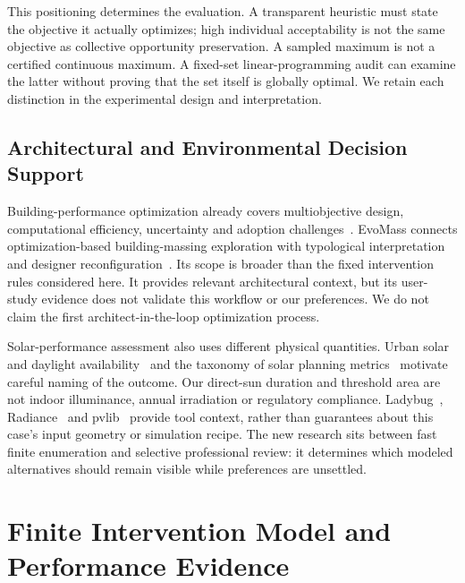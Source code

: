 \documentclass{llncs}
\begin{document}
This positioning determines the evaluation. A transparent heuristic must state the objective it actually optimizes; high individual acceptability is not the same objective as collective opportunity preservation. A sampled maximum is not a certified continuous maximum. A fixed-set linear-programming audit can examine the latter without proving that the set itself is globally optimal. We retain each distinction in the experimental design and interpretation.

\subsection{Architectural and Environmental Decision Support}
Building-performance optimization already covers multiobjective design, computational efficiency, uncertainty and adoption challenges~\cite{NguyenReiterRigo2014}. EvoMass connects optimization-based building-massing exploration with typological interpretation and designer reconfiguration~\cite{WangJanssenJi2024}. Its scope is broader than the fixed intervention rules considered here. It provides relevant architectural context, but its user-study evidence does not validate this workflow or our preferences. We do not claim the first architect-in-the-loop optimization process.

Solar-performance assessment also uses different physical quantities. Urban solar and daylight availability~\cite{compagnon2004urban} and the taxonomy of solar planning metrics~\cite{czachura2022metrics} motivate careful naming of the outcome. Our direct-sun duration and threshold area are not indoor illuminance, annual irradiation or regulatory compliance. Ladybug~\cite{roudsari2013ladybug}, Radiance~\cite{ward1994radiance} and pvlib~\cite{holmgren2018pvlib} provide tool context, rather than guarantees about this case's input geometry or simulation recipe. The new research sits between fast finite enumeration and selective professional review: it determines which modeled alternatives should remain visible while preferences are unsettled.

\section{Finite Intervention Model and Performance Evidence}
\end{document}
